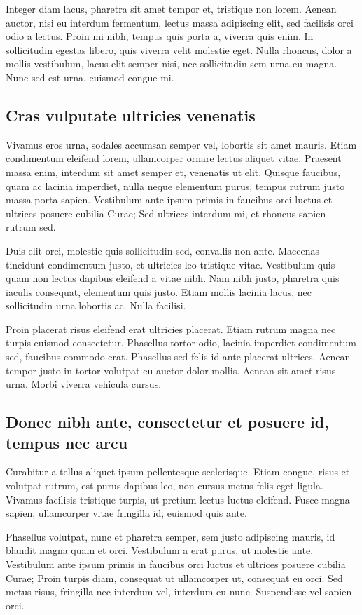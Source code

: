 Integer diam lacus, pharetra sit amet tempor et, tristique non lorem.
Aenean auctor, nisi eu interdum fermentum, lectus massa adipiscing elit,
sed facilisis orci odio a lectus. Proin mi nibh, tempus quis porta a,
viverra quis enim. In sollicitudin egestas libero, quis viverra velit
molestie eget. Nulla rhoncus, dolor a mollis vestibulum, lacus elit semper
nisi, nec sollicitudin sem urna eu magna. Nunc sed est urna, euismod congue
mi.

\subsection{Cras vulputate ultricies venenatis}
Vivamus eros urna, sodales accumsan semper vel, lobortis sit amet mauris.
Etiam condimentum eleifend lorem, ullamcorper ornare lectus aliquet vitae.
Praesent massa enim, interdum sit amet semper et, venenatis ut elit.
Quisque faucibus, quam ac lacinia imperdiet, nulla neque elementum purus,
tempus rutrum justo massa porta sapien. Vestibulum ante ipsum primis in
faucibus orci luctus et ultrices posuere cubilia Curae; Sed ultrices
interdum mi, et rhoncus sapien rutrum sed.

Duis elit orci, molestie quis sollicitudin sed, convallis non ante.
Maecenas tincidunt condimentum justo, et ultricies leo tristique vitae.
Vestibulum quis quam non lectus dapibus eleifend a vitae nibh. Nam nibh
justo, pharetra quis iaculis consequat, elementum quis justo. Etiam mollis
lacinia lacus, nec sollicitudin urna lobortis ac. Nulla facilisi.

Proin placerat risus eleifend erat ultricies placerat. Etiam rutrum magna
nec turpis euismod consectetur. Phasellus tortor odio, lacinia imperdiet
condimentum sed, faucibus commodo erat. Phasellus sed felis id ante
placerat ultrices. Aenean tempor justo in tortor volutpat eu auctor dolor
mollis. Aenean sit amet risus urna. Morbi viverra vehicula cursus.

\subsection{Donec nibh ante, consectetur et posuere id, tempus nec arcu}
Curabitur a tellus aliquet ipsum pellentesque scelerisque. Etiam congue,
risus et volutpat rutrum, est purus dapibus leo, non cursus metus felis
eget ligula. Vivamus facilisis tristique turpis, ut pretium lectus luctus
eleifend. Fusce magna sapien, ullamcorper vitae fringilla id, euismod quis
ante.

Phasellus volutpat, nunc et pharetra semper, sem justo adipiscing mauris,
id blandit magna quam et orci. Vestibulum a erat purus, ut molestie ante.
Vestibulum ante ipsum primis in faucibus orci luctus et ultrices posuere
cubilia Curae; Proin turpis diam, consequat ut ullamcorper ut, consequat eu
orci. Sed metus risus, fringilla nec interdum vel, interdum eu nunc.
Suspendisse vel sapien orci.

